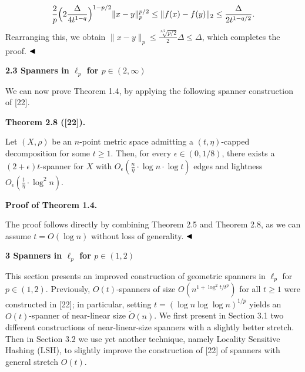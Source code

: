 \par
\[\begin{aligned}
\frac{2}{p}\Big{(}2\frac{\Delta}{4t^{1-q}}\Big{)}^{1-p/2}\|x-y\|_{p}^{p/2}\leq%
\|f(x)-f(y)\|_{2}\leq\frac{\Delta}{2t^{1-q/2}}.
\end{aligned}\]
Rearranging this, we obtain $\|x-y\|_{p}\leq\frac{\sqrt[p/2]{p/2}}{2}\Delta\leq\Delta$, which completes the proof. $\hfill\blacktriangleleft$
\par
\par
\par
\par
\par\medskip\noindent\textbf{2.3 Spanners in $\ell_{p}$ for $p\in(2,\infty)$}\par
We can now prove Theorem 1.4, by applying the following spanner construction of [22].
\par
\par
\par\medskip\noindent\textbf{Theorem 2.8 ([22]).}\par
Let $(X,\rho)$ be an $n$-point metric space admitting a $(t,\eta)$-capped decomposition for some $t\geq 1$. Then, for every $\epsilon\in(0,1/8)$, there exists a $(2+\epsilon)t$-spanner for $X$ with $O_{\epsilon}(\frac{n}{\eta}\cdot\log n\cdot\log t)$ edges and lightness $O_{\epsilon}(\frac{t}{\eta}\cdot\log^{2}n)$.
\par
\par
\par
\par\medskip\noindent\textbf{Proof of Theorem 1.4.}\par
The proof follows directly by combining Theorem 2.5 and Theorem 2.8, as we can assume $t=O(\log{n})$ without loss of generality. $\hfill\blacktriangleleft$
\par
\par
\par
\par
\par\medskip\noindent\textbf{3 Spanners in $\ell_{p}$ for $p\in(1,2)$}\par
This section presents an improved construction of geometric spanners in $\ell_{p}$ for $p\in(1,2)$. Previously, $O(t)$-spanners of size $O(n^{1+\log^{2}{t}/t^{p}})$ for all $t\geq 1$ were constructed in [22]; in particular, setting $t=(\log{n}\log{\log{n}})^{1/p}$ yields an $O(t)$-spanner of near-linear size $\tilde{O}(n)$. We first present in Section 3.1 two different constructions of near-linear-size spanners with a slightly better stretch. Then in Section 3.2 we use yet another technique, namely Locality Sensitive Hashing (LSH), to slightly improve the construction of [22] of spanners with general stretch $O(t)$.
